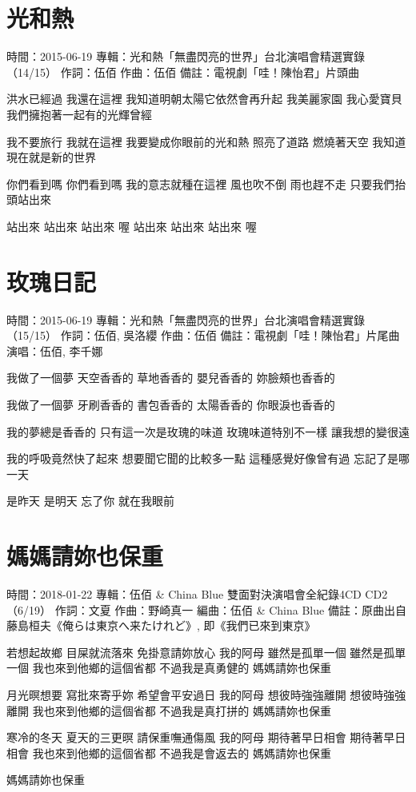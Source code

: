 \documentclass[UTF8,a4paper,oneside,twocolumn,12pt]{ctexbook}
\newcommand{\infopair}[2]{\textbullet #1：#2}
\newcommand{\zc}[1][伍佰]{\infopair{作詞}{#1}}
\newcommand{\zq}[1][伍佰]{\infopair{作曲}{#1}}
\newcommand{\bq}[1][伍佰]{\infopair{編曲}{#1}}
\newcommand{\zj}[1]{\infopair{專輯}{#1}}
\newcommand{\sj}[1]{\infopair{時間}{#1}}
\newcommand{\bz}[1]{\infopair{備註}{#1}}
\newenvironment{info}{\begin{flushleft}\kaishu
	}
	{\end{flushleft}\normalsize\yahei\par}
\newenvironment{lyric}{
	}
{}
\begin{document}
\section{光和熱}
\begin{info}
	\sj{2015-06-19}
	\zj{光和熱「無盡閃亮的世界」台北演唱會精選實錄（14/15）}
	\zc
	\zq
	\bz{電視劇「哇！陳怡君」片頭曲}
\end{info}
\begin{lyric}
	洪水已經過  我還在這裡
	我知道明朝太陽它依然會再升起
	我美麗家園  我心愛寶貝
	我們擁抱著一起有的光輝曾經

	我不要旅行  我就在這裡
	我要變成你眼前的光和熱
	照亮了道路  燃燒著天空
	我知道現在就是新的世界

	你們看到嗎   你們看到嗎
	我的意志就種在這裡
	風也吹不倒  雨也趕不走
	只要我們抬頭站出來

	站出來  站出來  站出來  喔
	站出來  站出來  站出來  喔
\end{lyric}

\section{玫瑰日記}
\begin{info}
	\sj{2015-06-19}
	\zj{光和熱「無盡閃亮的世界」台北演唱會精選實錄（15/15）}
	\zc[伍佰, 吳洛纓]
	\zq
	\bz{電視劇「哇！陳怡君」片尾曲}
	\infopair{演唱}{伍佰, 李千娜}
\end{info}
\begin{lyric}
	我做了一個夢
	天空香香的  草地香香的
	嬰兒香香的  妳臉頰也香香的

	我做了一個夢
	牙刷香香的  書包香香的
	太陽香香的  你眼淚也香香的

	我的夢總是香香的
	只有這一次是玫瑰的味道
	玫瑰味道特別不一樣
	讓我想的變很遠

	我的呼吸竟然快了起來
	想要聞它聞的比較多一點
	這種感覺好像曾有過
	忘記了是哪一天

	是昨天  是明天
	忘了你  就在我眼前
\end{lyric}

\section{媽媽請妳也保重}
\begin{info}
	\sj{2018-01-22}
	\zj{伍佰 \& China Blue 雙面對決演唱會全紀錄4CD CD2（6/19）}
	\zc[文夏]
	\zq[野崎真一]
	\bq[伍佰 \& China Blue]
	\bz{原曲出自藤島桓夫《俺らは東京へ来たけれど》, 即《我們已來到東京》}
\end{info}
\begin{lyric}
	若想起故鄉 目屎就流落來
	免掛意請妳放心 我的阿母
	雖然是孤單一個 雖然是孤單一個
	我也來到他鄉的這個省都
	不過我是真勇健的
	媽媽請妳也保重

	月光暝想要 寫批來寄乎妳
	希望會平安過日 我的阿母
	想彼時強強離開 想彼時強強離開
	我也來到他鄉的這個省都
	不過我是真打拼的
	媽媽請妳也保重

	寒冷的冬天 夏天的三更暝
	請保重嘸通傷風 我的阿母
	期待著早日相會 期待著早日相會
	我也來到他鄉的這個省都
	不過我是會返去的
	媽媽請妳也保重

	媽媽請妳也保重
\end{lyric}
\end{document}
